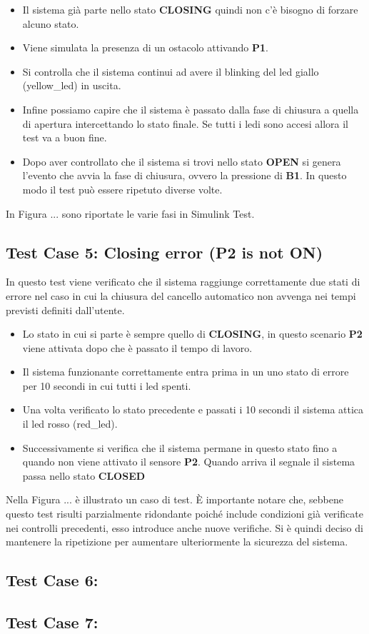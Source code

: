 \documentclass[12pt]{article}
\begin{document}
\begin{itemize}
    \item Il sistema già parte nello stato \textbf{CLOSING} quindi non c'è bisogno di forzare alcuno stato.
    \item Viene simulata la presenza di un ostacolo attivando \textbf{P1}.
    \item Si controlla che il sistema continui ad avere il blinking del led giallo (yellow\_led) in uscita.
    \item Infine possiamo capire che il sistema è passato dalla fase di chiusura a quella di apertura intercettando lo stato finale. Se tutti i ledi sono accesi allora il test va a buon fine. 
    \item Dopo aver controllato che il sistema si trovi nello stato \textbf{OPEN} si genera l'evento che avvia la fase di chiusura, ovvero la pressione di \textbf{B1}. In questo modo il test può essere ripetuto diverse volte.
\end{itemize}

In Figura ... sono riportate le varie fasi in Simulink Test.

\subsection{Test Case 5: Closing error (P2 is not ON)}
In questo test viene verificato che il sistema raggiunge correttamente due stati di errore nel caso in cui la chiusura del cancello automatico non avvenga nei tempi previsti definiti dall'utente.

\begin{itemize}
    \item Lo stato in cui si parte è sempre quello di \textbf{CLOSING}, in questo scenario \textbf{P2} viene attivata dopo che è passato il tempo di lavoro.
    \item Il sistema funzionante correttamente entra prima in un uno stato di errore per 10 secondi in cui tutti i led spenti.
    \item Una volta verificato lo stato precedente e passati i 10 secondi il sistema attica il led rosso (red\_led). 
    \item Successivamente si verifica che il sistema permane in questo stato fino a quando non viene attivato il sensore \textbf{P2}. Quando arriva il segnale il sistema passa nello stato \textbf{CLOSED}
\end{itemize}

Nella Figura ... è illustrato un caso di test. È importante notare che, sebbene questo test risulti parzialmente ridondante poiché include condizioni già verificate nei controlli precedenti, esso introduce anche nuove verifiche. Si è quindi deciso di mantenere la ripetizione per aumentare ulteriormente la sicurezza del sistema.

\subsection{Test Case 6: }

\subsection{Test Case 7: }
\end{document}
